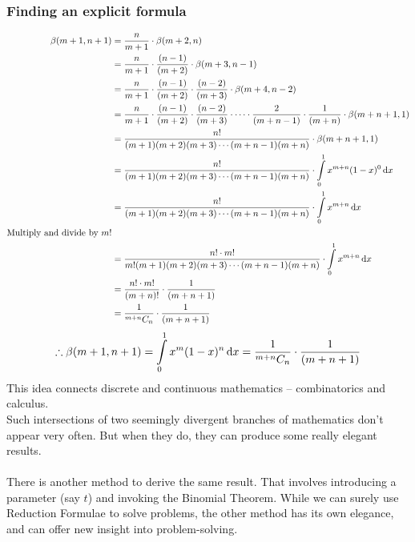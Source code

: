 \documentclass[14]{article}
\theoremstyle{definition}
\theoremstyle{case}
\begin{document}
\subsubsection*{Finding an explicit formula}
\begin{align*}
\beta(m+1, n+1) &= \dfrac{n}{m+1} \cdot \beta(m+2, n)\\
&= \dfrac{n}{m+1} \cdot \dfrac{(n-1)}{(m+2)} \cdot \beta(m+3, n-1)\\
&= \dfrac{n}{m+1} \cdot \dfrac{(n-1)}{(m+2)} \cdot \dfrac{(n-2)}{(m+3)} \cdot \beta(m+4, n-2)\\
&= \dfrac{n}{m+1} \cdot \dfrac{(n-1)}{(m+2)} \cdot \dfrac{(n-2)}{(m+3)} \cdot \cdots \cdot  \dfrac{2}{(m+n-1)} \cdot \dfrac{1}{(m+n)} \cdot \beta(m+n+1, 1)\\
&= \dfrac{n!}{(m+1)(m+2)(m+3)\cdots (m+n-1)(m+n)}\cdot\beta(m+n+1, 1)\\
&= \dfrac{n!}{(m+1)(m+2)(m+3)\cdots (m+n-1)(m+n)}\cdot \int\limits_0^1 x^{m+n} (1-x)^0 \dif x\\
&= \dfrac{n!}{(m+1)(m+2)(m+3)\cdots (m+n-1)(m+n)}\cdot \int\limits_0^1 x^{m+n} \dif x\\
\text{Multiply and divide by } m!\\
&= \dfrac{n! \cdot m!}{m!(m+1)(m+2)(m+3)\cdots (m+n-1)(m+n)}\cdot \int\limits_0^1 x^{m+n} \dif x\\
&= \dfrac{n!\cdot m!}{(m+n)!}\cdot \dfrac1{(m+n+1)}\\
&= \dfrac1{^{m+n}C_n} \cdot \dfrac1{(m+n+1)}
\end{align*}
\[\therefore \beta(m+1, n+1) = \int\limits_0^1 x^m (1-x)^n \dif x =  \dfrac1{^{m+n}C_n} \cdot \dfrac1{(m+n+1)}\]
This idea connects discrete and continuous mathematics -- combinatorics and calculus.\\
Such intersections of two seemingly divergent branches of mathematics don't appear very often. But when they do, they can produce some really elegant results.\\\\
There is another method to derive the same result. That involves introducing a parameter (say $t$) and invoking the Binomial Theorem. While we can surely use Reduction Formulae to solve problems, the other method has its own elegance, and can offer new insight into problem-solving.
\pagebreak
\end{document}
